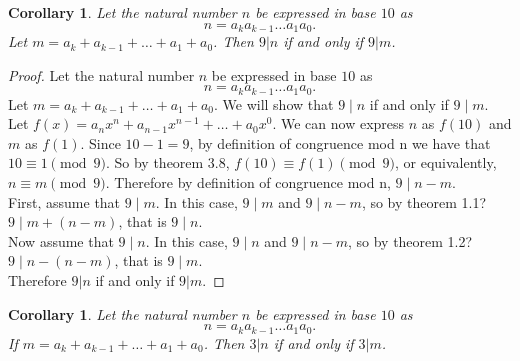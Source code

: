 \documentclass[12pt,leqno]{article}
\numberwithin{equation}{section}
\newtheorem{cor}[thm]{Corollary}
\theoremstyle{definition}
\begin{document}
\begin{cor}
Let the natural number $n$ be expressed in base $10$ as
\[n = a_k a_{k-1} \hdots a_1 a_0. \]
 Let $m = a_k + a_{k-1} + \hdots + a_1 + a_0$. Then $9|n$ if and only if $9|m$.
\end{cor}

\begin{proof}[Proof]
Let the natural number $n$ be expressed in base $10$ as
\[n = a_k a_{k-1} \hdots a_1 a_0. \]
Let $m = a_k + a_{k-1} + \hdots + a_1 + a_0$. We will show that $9 \mid n$ if and only if $9 \mid m$.\\

Let $f(x) = a_nx^n + a_{n-1}x^{n-1} + \hdots + a_0x^0$.  We can now express $n$ as $f(10)$ and $m$ as $f(1)$.  Since $10 - 1 = 9$, by definition of congruence mod n we have that $10 \equiv 1 \pmod{9}$.  So by theorem 3.8, $f(10) \equiv f(1) \pmod{9}$, or equivalently, $n \equiv m \pmod{9}$.  Therefore by definition of congruence mod n, $9 \mid n - m$.\\

First, assume that $9 \mid m$.  In this case, $9 \mid m$ and $9 \mid n-m$, so by theorem 1.1? $9 \mid m + (n-m)$, that is $9\mid n$.\\

Now assume that $9 \mid n$.  In this case, $9 \mid n$ and $9 \mid n-m$, so by theorem 1.2? $9 \mid n - (n-m)$, that is $9\mid m$.\\

Therefore $9|n$ if and only if $9|m$.
\end{proof}


\begin{cor}
Let the natural number $n$ be expressed in base $10$ as
\[n = a_k a_{k-1} \hdots a_1 a_0. \]
If $m = a_k + a_{k-1} + \hdots + a_1 + a_0$. Then $3|n$ if and only
if $3|m$.
\end{cor}
\end{document}

